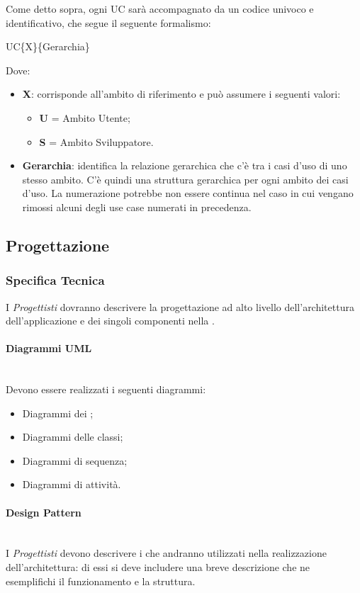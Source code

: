 Come detto sopra, ogni UC sarà accompagnato da un codice univoco e identificativo, che segue il seguente formalismo:
\begin{center}
UC\{X\}\{Gerarchia\}
\end{center}
Dove:
\begin{itemize}
\item \textbf{X}: corrisponde all'ambito di riferimento e può assumere i seguenti valori:
\begin{itemize}
\item \textbf{U} = Ambito Utente;
\item \textbf{S} = Ambito Sviluppatore.
\end{itemize}
\item \textbf{Gerarchia}: identifica la relazione gerarchica che c'è tra i casi d'uso di uno stesso ambito. C'è quindi una struttura gerarchica per ogni ambito dei casi d'uso. La numerazione potrebbe non essere continua nel caso in cui vengano rimossi alcuni degli use case numerati in precedenza.
\end{itemize}

\subsection{Progettazione}
\subsubsection{Specifica Tecnica}
I \textit{Progettisti} dovranno descrivere la progettazione ad alto livello dell'architettura dell'applicazione e dei singoli componenti nella \SpecificaTecnica{}.

\paragraph{Diagrammi UML}\mbox{}\\
Devono essere realizzati i seguenti diagrammi:
\begin{itemize}
\item Diagrammi dei ;
\item Diagrammi delle classi;
\item Diagrammi di sequenza;
\item Diagrammi di attività.
\end{itemize}

\paragraph{Design Pattern}\mbox{}\\
I \textit{Progettisti} devono descrivere i  che andranno utilizzati nella realizzazione dell'architettura: di essi si deve includere una breve descrizione che ne esemplifichi il funzionamento e la struttura.

